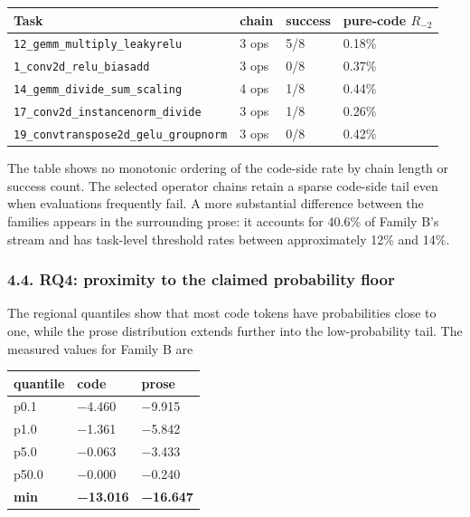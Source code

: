 \documentclass[
  11pt,
]{article}
\begin{document}
\begin{center}
\begin{minipage}{\linewidth}
\centering
\begin{tabular}{@{}llll@{}}
\toprule
Task & chain & success & pure-code \(R_{-2}\) \\
\midrule

\texttt{12\_gemm\_multiply\_leakyrelu} & 3 ops & 5/8 & 0.18\% \\
\texttt{1\_conv2d\_relu\_biasadd} & 3 ops & 0/8 & 0.37\% \\
\texttt{14\_gemm\_divide\_sum\_scaling} & 4 ops & 1/8 & 0.44\% \\
\texttt{17\_conv2d\_instancenorm\_divide} & 3 ops & 1/8 & 0.26\% \\
\texttt{19\_convtranspose2d\_gelu\_groupnorm} & 3 ops & 0/8 & 0.42\% \\
\bottomrule
\end{tabular}
\end{minipage}
\end{center}

The table shows no monotonic ordering of the code-side rate by chain
length or success count. The selected operator chains retain a sparse
code-side tail even when evaluations frequently fail. A more substantial
difference between the families appears in the surrounding prose: it
accounts for 40.6\% of Family B's stream and has task-level threshold
rates between approximately 12\% and 14\%.

\hypertarget{rq4-proximity-to-the-claimed-probability-floor}{%
\subsubsection{4.4. RQ4: proximity to the claimed probability
floor}\label{rq4-proximity-to-the-claimed-probability-floor}}

The regional quantiles show that most code tokens have probabilities
close to one, while the prose distribution extends further into the
low-probability tail. The measured values for Family B are

\begin{center}
\begin{minipage}{\linewidth}
\centering
\begin{tabular}{@{}lll@{}}
\toprule
quantile & code & prose \\
\midrule

p0.1 & −4.460 & −9.915 \\
p1.0 & −1.361 & −5.842 \\
p5.0 & −0.063 & −3.433 \\
p50.0 & −0.000 & −0.240 \\
\textbf{min} & \textbf{−13.016} & \textbf{−16.647} \\
\bottomrule
\end{tabular}
\end{minipage}
\end{center}
\end{document}
